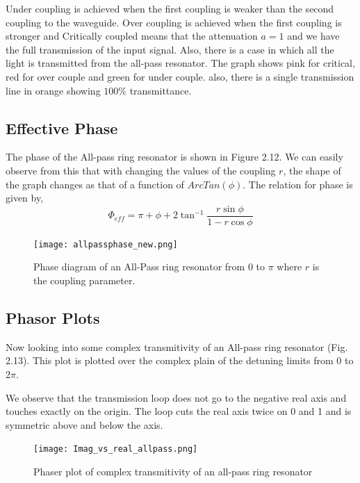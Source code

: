 Under coupling is achieved when the first coupling is weaker than the second coupling to the waveguide. Over coupling is achieved when the first coupling is stronger and Critically coupled means that the attenuation $a = 1$ and we have the full transmission of the input signal. Also, there is a case in which all the light is transmitted from the all-pass resonator. The graph shows pink for critical, red for over couple and green for under couple. also, there is a single transmission line in orange showing $100\%$ transmittance.



\subsection{Effective Phase}
The phase of the All-pass ring resonator is shown in Figure 2.12. We can easily observe from this that with changing the values of the coupling $r$, the shape of the graph changes as that of a function of $ArcTan(\phi)$. The relation for phase is given by,
\begin{equation}
\Phi_{eff} = \pi + \phi + 2\tan^{-1}\frac{r\sin\phi}{1-r\cos\phi}
\end{equation}

\begin{figure}[h]
\centering
\texttt{[image: allpassphase\_new.png]}
\caption{Phase diagram of an All-Pass ring resonator from 0 to $\pi$ where $r$ is the coupling parameter.}
\end{figure}

\subsection{Phasor Plots}
Now looking into some complex transmitivity of an All-pass ring resonator (Fig. 2.13). This plot is plotted over the complex plain of the detuning limits from 0 to 2$\pi$. 

We observe that the transmission loop does not go to the negative real axis and touches exactly on the origin. The loop cuts the real axis twice on 0 and 1 and is symmetric above and below the axis. 
\begin{figure}[h]
\centering
\texttt{[image: Imag\_vs\_real\_allpass.png]}
\caption{Phaser plot of complex transmitivity of an all-pass ring resonator}
\end{figure}


